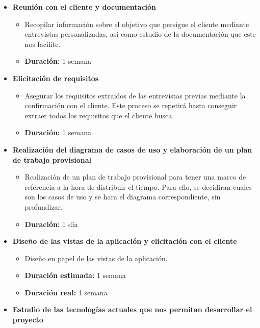 \documentclass[openright,twoside,10pt]{book}
\providecommand{\tightlist}{%
  \setlength{\itemsep}{0pt}\setlength{\parskip}{0pt}}
\begin{document}
    \begin{itemize}
    \tightlist
    \item
      \textbf{Reunión con el cliente y documentación}
    
      \begin{itemize}
      \tightlist
      \item
        Recopilar información sobre el objetivo que persigue el cliente
        mediante entrevistas personalizadas, así como estudio de la
        documentación que este nos facilite.
      \item
        \textbf{Duración:} 1 semana
      \end{itemize}
    \item
      \textbf{Elicitación de requisitos}
    
      \begin{itemize}
      \tightlist
      \item
        Asegurar los requisitos extraidos de las entrevistas previas
        mediante la confirmación con el cliente. Este proceso se repetirá
        hasta conseguir extraer todos los requisitos que el cliente busca.
      \item
        \textbf{Duración:} 1 semana
      \end{itemize}
    \item
      \textbf{Realización del diagrama de casos de uso y elaboración de un
      plan de trabajo provisional}
    
      \begin{itemize}
      \tightlist
      \item
        Realización de un plan de trabajo provisional para tener una marco
        de referencia a la hora de distribuir el tiempo. Para ello, se
        decidiran cuales son los casos de uso y se hara el diagrama
        correspondiente, sin profundizar.
      \item
        \textbf{Duración:} 1 día
      \end{itemize}
    \item
      \textbf{Diseño de las vistas de la aplicación y elicitación con el
      cliente}
    
      \begin{itemize}
      \tightlist
      \item
        Diseño en papel de las vistas de la aplicación.
      \item
        \textbf{Duración estimada:} 1 semana
      \item
        \textbf{Duración real:} 1 semana
      \end{itemize}
    \item
      \textbf{Estudio de las tecnologías actuales que nos permitan
      desarrollar el proyecto}
    

\end{itemize}
\end{document}

